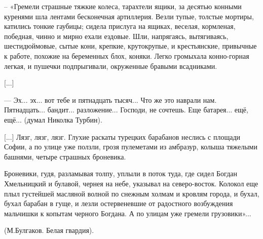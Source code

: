  
 
 
 
 


– «Гремели страшные тяжкие колеса, тарахтели ящики, за десятью конными куренями
шла лентами бесконечная артиллерия. Везли тупые, толстые мортиры, катились
тонкие гаубицы; сидела прислуга на ящиках, веселая, кормленая, победная, чинно
и мирно ехали ездовые. Шли, напрягаясь, вытягиваясь, шестидюймовые, сытые кони,
крепкие, крутокрупые, и крестьянские, привычные к работе, похожие на беременных
блох, коняки. Легко громыхала конно-горная легкая, и пушечки подпрыгивали,
окруженные бравыми всадниками.

[...]

— Эх... эх... вот тебе и пятнадцать тысяч... Что же это наврали нам.
Пятнадцать...  бандит... разложение... Господи, не сочтешь. Еще батарея... ещё,
ещё... (думал Николка Турбин).

[...] Лязг, лязг, лязг. Глухие раскаты турецких барабанов неслись с площади
Софии, а по улице уже ползли, грозя пулеметами из амбразур, колыша тяжелыми
башнями, четыре страшных броневика.

Броневики, гудя, разламывая толпу, уплыли в поток туда, где сидел Богдан
Хмельницкий и булавой, чернея на небе, указывал на северо-восток. Колокол еще
плыл густейшей масляной волной по снежным холмам и кровлям города, и бухал,
бухал барабан в гуще, и лезли остервеневшие от радостного возбуждения мальчишки
к копытам черного Богдана. А по улицам уже гремели грузовики»...

(М.Булгаков. Белая гвардия).
